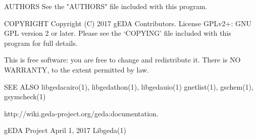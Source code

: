AUTHORS
       See the "AUTHORS" file included with this program.

COPYRIGHT
       Copyright (C) 2017 gEDA Contributors. License GPLv2+: GNU GPL
       version 2 or later. Please see the `COPYING' file included with this
       program for full details.

       This is free software: you are free to change and redistribute it.
       There is NO WARRANTY, to the extent permitted by law.

SEE ALSO
       libgedacairo(1),  libgedathon(1), libgedauio(1) gnetlist(1), gschem(1),
       gsymcheck(1)

       http://wiki.geda-project.org/geda:documentation.



gEDA Project                     April 1, 2017                      Libgeda(1)
